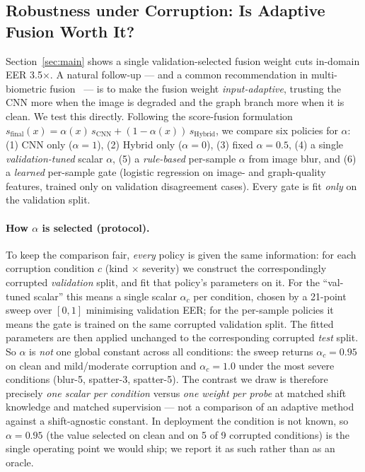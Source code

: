 \documentclass[11pt]{article}
\begin{document}
\subsection{Robustness under Corruption: Is Adaptive Fusion Worth It?}\label{sec:corrupt}
Section~\ref{sec:main} shows a single validation-selected fusion weight cuts in-domain EER
3.5$\times$. A natural follow-up --- and a common recommendation in multi-biometric fusion~\cite{qualityfusion}
--- is to make the fusion weight \emph{input-adaptive}, trusting the CNN more when the image
is degraded and the graph branch more when it is clean. We test this directly. Following the
score-fusion formulation $s_{\text{final}}(x)=\alpha(x)\,s_{\text{CNN}}+(1-\alpha(x))\,s_{\text{Hybrid}}$,
we compare six policies for $\alpha$: (1) CNN only ($\alpha{=}1$), (2) Hybrid only
($\alpha{=}0$), (3) fixed $\alpha{=}0.5$, (4) a single \emph{validation-tuned} scalar
$\alpha$, (5) a \emph{rule-based} per-sample $\alpha$ from image blur, and (6) a
\emph{learned} per-sample gate (logistic regression on image- and graph-quality features,
trained only on validation disagreement cases). Every gate is fit \emph{only} on the
validation split.

\paragraph{How $\alpha$ is selected (protocol).} To keep the comparison fair, \emph{every}
policy is given the same information: for each corruption condition $c$ (kind $\times$
severity) we construct the correspondingly corrupted \emph{validation} split, and fit that
policy's parameters on it. For the ``val-tuned scalar'' this means a single scalar
$\alpha_c$ per condition, chosen by a 21-point sweep over $[0,1]$ minimising validation EER;
for the per-sample policies it means the gate is trained on the same corrupted validation
split. The fitted parameters are then applied unchanged to the corresponding corrupted
\emph{test} split. So $\alpha$ is \emph{not} one global constant across all conditions: the
sweep returns $\alpha_c{=}0.95$ on clean and mild/moderate corruption and $\alpha_c{=}1.0$
under the most severe conditions (blur-5, spatter-3, spatter-5). The contrast we draw is
therefore precisely \emph{one scalar per condition} versus \emph{one weight per probe} at
matched shift knowledge and matched supervision --- not a comparison of an adaptive method
against a shift-agnostic constant. In deployment the condition is not known, so
$\alpha{=}0.95$ (the value selected on clean and on 5 of 9 corrupted conditions) is the
single operating point we would ship; we report it as such rather than as an oracle.
\end{document}
